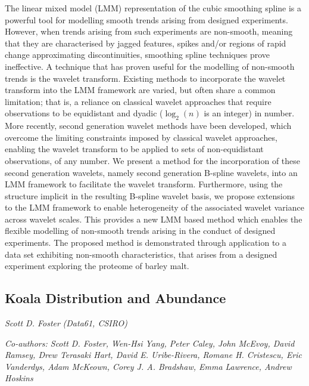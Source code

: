 \documentclass[
]{scrreprt}
\begin{document}
The linear mixed model (LMM) representation of the cubic smoothing
spline is a powerful tool for modelling smooth trends arising from
designed experiments. However, when trends arising from such experiments
are non-smooth, meaning that they are characterised by jagged features,
spikes and/or regions of rapid change approximating discontinuities,
smoothing spline techniques prove ineffective. A technique that has
proven useful for the modelling of non-smooth trends is the wavelet
transform. Existing methods to incorporate the wavelet transform into
the LMM framework are varied, but often share a common limitation; that
is, a reliance on classical wavelet approaches that require observations
to be equidistant and dyadic (\(\log_{2}(n)\) is an integer) in number.
More recently, second generation wavelet methods have been developed,
which overcome the limiting constraints imposed by classical wavelet
approaches, enabling the wavelet transform to be applied to sets of
non-equidistant observations, of any number. We present a method for the
incorporation of these second generation wavelets, namely second
generation B-spline wavelets, into an LMM framework to facilitate the
wavelet transform. Furthermore, using the structure implicit in the
resulting B-spline wavelet basis, we propose extensions to the LMM
framework to enable heterogeneity of the associated wavelet variance
across wavelet scales. This provides a new LMM based method which
enables the flexible modelling of non-smooth trends arising in the
conduct of designed experiments. The proposed method is demonstrated
through application to a data set exhibiting non-smooth characteristics,
that arises from a designed experiment exploring the proteome of barley
malt.

\subsection{Koala Distribution and
Abundance}\label{koala-distribution-and-abundance}

\emph{Scott D. Foster} \emph{(Data61, CSIRO)}

\emph{Co-authors: Scott D. Foster, Wen-Hsi Yang, Peter Caley, John
McEvoy, David Ramsey, Drew Terasaki Hart, David E. Uribe-Rivera, Romane
H. Cristescu, Eric Vanderdys, Adam McKeown, Corey J. A. Bradshaw, Emma
Lawrence, Andrew Hoskins}

\setlength{\parskip}{0.5em}
\end{document}
